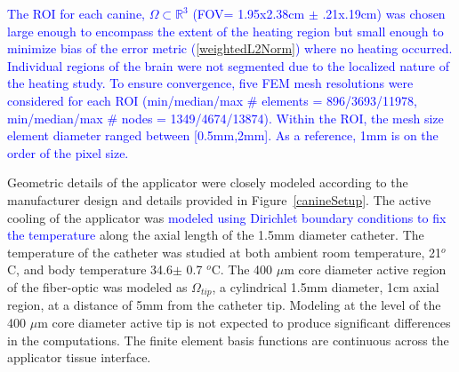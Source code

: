\documentclass{article}
\newcommand{\eqn}[1]{(\ref{#1})}
\begin{document}


\textcolor{blue}{ %
The ROI for each canine, $\Omega \subset \mathbb{R}^3$ (FOV=
1.95x2.38cm $\pm$ .21x.19cm) 
was chosen large enough to encompass the
extent of the heating region but small enough to minimize bias of
the error metric \eqn{weightedL2Norm} where no  heating occurred.
Individual regions of the brain were not segmented due to the
localized nature of the heating study.
To ensure convergence, five FEM mesh resolutions were considered for
each ROI (min/median/max \# elements = 896/3693/11978, 
          min/median/max \# nodes    = 1349/4674/13874).
Within the ROI, the mesh size element diameter ranged between
[0.5mm,2mm]. As a reference, 1mm is on the order of the pixel size.
}


Geometric details of the applicator were closely modeled according
to the manufacturer design and details provided in
Figure~\ref{canineSetup}.  The active cooling of the applicator was
\textcolor{blue}{ %
modeled using Dirichlet boundary conditions to fix the temperature
}
along the axial length of the 1.5mm diameter catheter.  The
temperature of the catheter was studied at both ambient room
temperature, 21$^o$C, and body temperature 34.6$\pm$ 0.7 $^o$C.
The 400 $\mu$m core diameter active region of the fiber-optic was
modeled as $\Omega_{tip}$, a cylindrical 1.5mm diameter, 1cm axial
region, at a distance of 5mm from the catheter tip. Modeling at the
level of the 400 $\mu$m core diameter active tip is not expected to
produce significant differences in the computations.  The finite
element basis functions are continuous across the applicator tissue
interface.  
\end{document}

